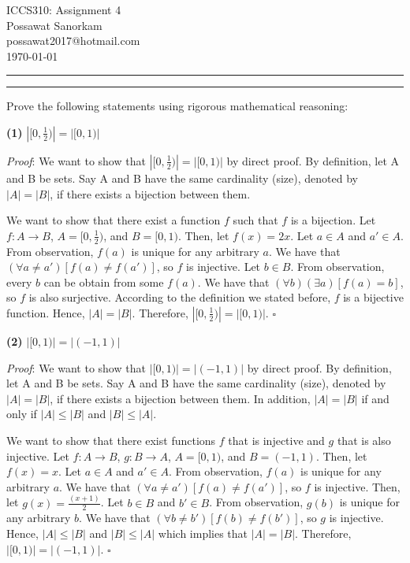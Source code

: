 \documentclass[a4paper, 11pt]{article}
\makeatletter
\newcommand{\question}[2] {\vspace{.25in} \hrule\vspace{0.5em}
	\noindent{\bf #1: #2} \vspace{0.5em}
	\hrule \vspace{.10in}}
\renewcommand{\part}[1] {\vspace{.10in} {\bf (#1)}}
\newcommand{\myname}{Possawat Sanorkam}
\newcommand{\myemail}{possawat2017@hotmail.com}
\newcommand{\myhwnum}{4}
\makeatother
\begin{document}
	
	\medskip                        %
	
	\thispagestyle{plain}
	\begin{center}                  %
		{\Large ICCS310: Assignment \myhwnum} \\
		\myname \\
		\myemail \\
		\today \\
	\end{center}
	
	\question{1}{Eh? They Have The Same Cardinality?} %
	Prove the following statements using rigorous mathematical reasoning:
	
	\part{1} $|[0,\frac{1}{2})| = |[0,1)|$
	
	{\em Proof}: We want to show that $|[0,\frac{1}{2})| = |[0,1)|$ by direct proof.  By definition, let A and B be sets. Say A and B have the same cardinality (size), denoted by $|A| = |B|$, if there exists a bijection between them. 
	
	We want to show that there exist a function $f$ such that $f$ is a bijection. Let $f:A \rightarrow B$, $A = [0,\frac{1}{2})$, and $B = [0,1)$. Then, let $f(x) = 2x$. Let $a \in A$ and $a' \in A$. From observation, $f(a)$ is unique for any arbitrary $a$. We have that $ ( \forall a \neq a')[ f(a) \neq f(a')]$, so $f$ is injective. Let $b \in B$. From observation, every $b$ can be obtain from some $f(a)$. We have that $ ( \forall b)( \exists a)[ f(a) = b]$, so $f$ is also surjective. According to the definition we stated before, $f$ is a bijective function. Hence, $|A| = |B|$. Therefore, $|[0,\frac{1}{2})| = |[0,1)|$. $\square$
	
	
	\part{2} $|[0,1)| = |(-1,1)|$
	
	{\em Proof}: We want to show that $|[0,1)| = |(-1,1)|$ by direct proof. By definition, let A and B be sets. Say A and B have the same cardinality (size), denoted by $|A| = |B|$, if there exists a bijection between them. In addition, $|A|=|B|$ if and only if $|A| \leq |B|$ and $|B| \leq |A|$. 
	
	We want to show that there exist functions $f$ that is injective and $g$ that is also injective. Let $f:A \rightarrow B$, $g:B \rightarrow A$, $A = [0,1)$, and $B = (-1,1)$. Then, let $f(x) = x$. Let $a \in A$ and $a' \in A$. From observation, $f(a)$ is unique for any arbitrary $a$. We have that $ ( \forall a \neq a')[ f(a) \neq f(a')]$, so $f$ is injective. 
	Then, let $g(x) = \frac{(x+1)}{2}$.  Let $b \in B$ and $b' \in B$. From observation, $g(b)$ is unique for any arbitrary $b$. We have that $ ( \forall b \neq b')[ f(b) \neq f(b')]$, so $g$ is injective. Hence, $|A| \leq |B|$ and $|B| \leq |A|$ which implies that $|A| = |B|$. Therefore, $|[0,1)| = |(-1,1)|$. $\square$
	
\end{document}
